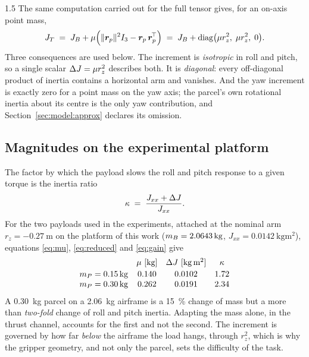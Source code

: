 \begin{spacing}{1.5}
The same computation carried out for the full tensor gives, for an on-axis
point mass,
\begin{equation}
J_T \;=\; J_B + \mu\Bigl(\lVert\bm{r}_p\rVert^2 I_3 - \bm{r}_p\,\bm{r}_p^{\!\top}\Bigr)
\;=\; J_B + \mathrm{diag}\bigl(\mu r_z^2,\; \mu r_z^2,\; 0\bigr).
\label{eq:Jdeployed}
\end{equation}
Three consequences are used below. The increment is \emph{isotropic} in roll and
pitch, so a single scalar $\Delta J=\mu r_z^2$ describes both. It is
\emph{diagonal}: every off-diagonal product of inertia contains a horizontal arm
and vanishes. And the yaw increment is exactly zero for a point mass on the yaw
axis; the parcel's own rotational inertia about its centre is the only yaw
contribution, and Section~\ref{sec:model:approx} declares its omission.

\subsection{Magnitudes on the experimental platform}\label{sec:model:magnitudes}

The factor by which the payload slows the roll and pitch response to a given
torque is the inertia ratio
\begin{equation}
\kappa \;=\; \frac{J_{xx} + \Delta J}{J_{xx}} .
\label{eq:gain}
\end{equation}
For the two payloads used in the experiments, attached at the nominal arm
$r_z=\SI{-0.27}{\meter}$ on the platform of this work
($\mB = \SI{2.0643}{\kg}$, $J_{xx} = \SI{0.0142}{\kg\meter\squared}$),
equations \eqref{eq:mu}, \eqref{eq:reduced} and \eqref{eq:gain} give
\begin{equation}
\begin{array}{lccc}
 & \mu\ [\si{\kg}] & \dJ\ [\si{\kg\meter\squared}] & \kappa \\[2pt]
\mP=\SI{0.15}{\kg} & 0.140 & 0.0102 & 1.72 \\
\mP=\SI{0.30}{\kg} & 0.262 & 0.0191 & 2.34
\end{array}
\label{eq:numbers}
\end{equation}
A \SI{0.30}{\kg} parcel on a \SI{2.06}{\kg} airframe is a \SI{15}{\percent}
change of mass but a more than \emph{two-fold} change of roll and pitch inertia.
Adapting the mass alone, in the thrust channel, accounts for the first and not
the second. The increment is governed by how far \emph{below} the airframe the
load hangs, through $r_z^2$, which is why the gripper geometry, and not only the
parcel, sets the difficulty of the task.


\end{spacing}
